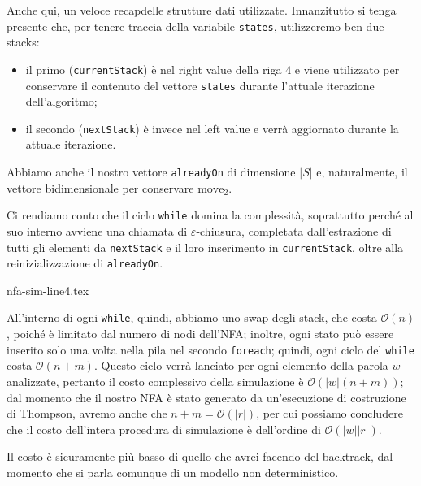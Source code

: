 \documentclass[class=book, crop=false, oneside, 12pt]{standalone}
\begin{document}
\noindent Anche qui, un veloce recapdelle strutture dati utilizzate. Innanzitutto si tenga presente che, per tenere traccia della variabile \texttt{states}, utilizzeremo ben due stacks:

\begin{itemize}
    \item il primo (\texttt{currentStack}) è nel right value della riga \(4\) e viene utilizzato per conservare il contenuto del vettore \texttt{states} durante l'attuale iterazione dell'algoritmo;
    \item il secondo (\texttt{nextStack}) è invece  nel left value e verrà aggiornato durante la attuale iterazione.
\end{itemize}

\noindent Abbiamo anche il nostro vettore \texttt{alreadyOn} di dimensione \(|S|\) e, naturalmente, il vettore bidimensionale per conservare \(\textrm{move}_2\).

Ci rendiamo conto che il ciclo \texttt{while} domina la complessità, soprattutto perché al suo interno avviene una chiamata di \(\varepsilon\)-chiusura, completata dall'estrazione di tutti gli elementi da \texttt{nextStack} e il loro inserimento in \texttt{currentStack}, oltre alla reinizializzazione di \texttt{alreadyOn}.

{nfa-sim-line4.tex}

All'interno di ogni \texttt{while}, quindi, abbiamo uno swap degli stack, che costa \(\mathcal{O}(n)\), poiché è limitato dal numero di nodi dell'NFA; inoltre, ogni stato può essere inserito solo una volta nella pila nel secondo \texttt{foreach}; quindi, ogni ciclo del \texttt{while} costa \(\mathcal{O}(n + m)\). Questo ciclo verrà lanciato per ogni elemento della parola \(w\) analizzate, pertanto il costo complessivo della simulazione è \(\mathcal{O}(|w|(n + m))\); dal momento che il nostro NFA è stato generato da un'esecuzione di costruzione di Thompson, avremo anche che \(n + m = \mathcal{O}(|r|)\), per cui possiamo concludere che il costo  dell'intera procedura di simulazione è dell'ordine di \(\mathcal{O}(|w||r|)\).

Il costo è sicuramente più basso di quello che avrei facendo del backtrack, dal momento che si parla comunque di un modello non deterministico. 
\end{document}
